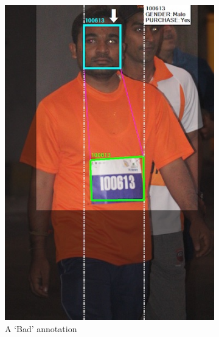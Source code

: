 \begin{figure}
\begin{subfigure}[b]{0.30\textwidth}
    \includegraphics[width=\textwidth]{images/dataset/argus/quality_tagging_bad_invalid_rbn}
    \caption{A `Bad' annotation}
    \label{fig:dataset:argus:qualituy_tiers:bad_invalid_rbn}
  \end{subfigure}
  \hspace{\fill}
  \begin{subfigure}[b]{0.30\textwidth}

\end{subfigure}
\end{figure}
